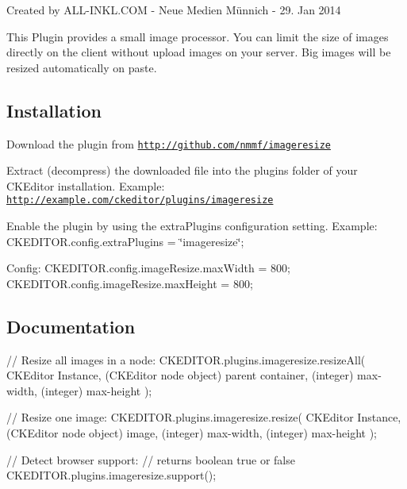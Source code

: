 Created by A\+L\+L-\/\+I\+N\+K\+L.\+C\+O\+M -\/ Neue Medien Münnich -\/ 29. Jan 2014

This Plugin provides a small image processor. You can limit the size of images directly on the client without upload images on your server. Big images will be resized automatically on paste.

\subsection*{Installation}


\begin{DoxyEnumerate}
\item Download the plugin from \href{http://github.com/nmmf/imageresize}{\tt http\+://github.\+com/nmmf/imageresize}
\item Extract (decompress) the downloaded file into the plugins folder of your C\+K\+Editor installation. Example\+: \href{http://example.com/ckeditor/plugins/imageresize}{\tt http\+://example.\+com/ckeditor/plugins/imageresize}
\item Enable the plugin by using the extra\+Plugins configuration setting. Example\+: C\+K\+E\+D\+I\+T\+O\+R.\+config.\+extra\+Plugins = \char`\"{}imageresize\char`\"{};
\item Config\+: C\+K\+E\+D\+I\+T\+O\+R.\+config.\+image\+Resize.\+max\+Width = 800; C\+K\+E\+D\+I\+T\+O\+R.\+config.\+image\+Resize.\+max\+Height = 800;
\end{DoxyEnumerate}

\subsection*{Documentation}

// Resize all images in a node\+: C\+K\+E\+D\+I\+T\+O\+R.\+plugins.\+imageresize.\+resize\+All( C\+K\+Editor Instance, (C\+K\+Editor node object) parent container, (integer) max-\/width, (integer) max-\/height );

// Resize one image\+: C\+K\+E\+D\+I\+T\+O\+R.\+plugins.\+imageresize.\+resize( C\+K\+Editor Instance, (C\+K\+Editor node object) image, (integer) max-\/width, (integer) max-\/height );

// Detect browser support\+: // returns boolean true or false C\+K\+E\+D\+I\+T\+O\+R.\+plugins.\+imageresize.\+support(); 